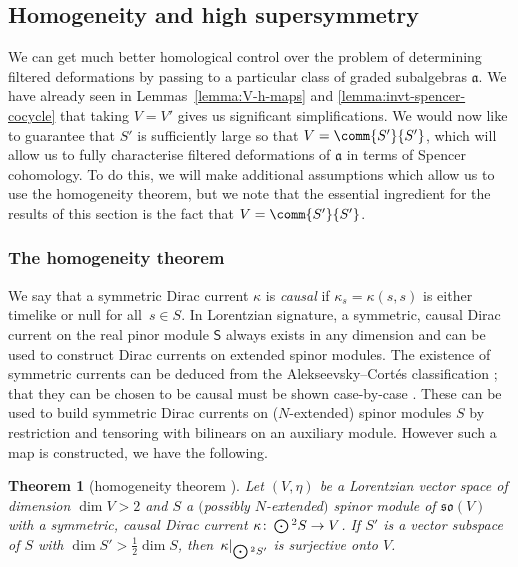 \documentclass[pdftex]{sigma}
\numberwithin{equation}{section}
\newtheorem{Theorem}{Theorem}[section]
\newcommand{\fa}{\mathfrak{a}}
\newcommand{\fso}{\mathfrak{so}}
\newcommand{\ssS}{\mathsf{S}}
\newcommand{\Odot}{\mathchoice{{\textstyle\bigodot}}{\bigodot}{\bigodot}{\bigodot}}
\newcommand{\1}{\mathbbm{1}}
\begin{document}
\subsection{Homogeneity and high supersymmetry}
\label{sec:homogeneity}

We can get much better homological control over the problem of determining filtered deformations by passing to a particular class of graded subalgebras $\fa$. We have already seen in Lemmas~\ref{lemma:V-h-maps} and \ref{lemma:invt-spencer-cocycle} that taking $V=V'$ gives us significant simplifications. We would now like to guarantee that $S'$ is sufficiently large so that $V=\comm{S'}{S'}$, which will allow us to fully characterise filtered deformations of $\fa$ in terms of Spencer cohomology. To do this, we will make additional assumptions which allow us to use the homogeneity theorem, but we note that the essential ingredient for the results of this section is the fact that $V=\comm{S'}{S'}$.

\subsubsection{The homogeneity theorem}

We say that a symmetric Dirac current $\kappa$ is \emph{causal} if $\kappa_s=\kappa(s,s)$ is either timelike or null for all~${s\in S}$. In Lorentzian signature, a symmetric, causal Dirac current on the real pinor module $\ssS$ always exists in any dimension and can be used to construct Dirac currents on extended spinor modules. The existence of symmetric currents can be deduced from the Alekseevsky--Cort\'es classification \cite{Alekseevsky1997}; that they can be chosen to be causal must be shown case-by-case \cite{Hustler2016}. These can be used to build symmetric Dirac currents on ($N$-extended) spinor modules $S$ by restriction and tensoring with bilinears on an auxiliary module. However such a map is constructed, we have the following.

\begin{Theorem}[homogeneity theorem \cite{Figueroa-OFarrill2012,Hustler2016}]\label{thm:homogeneity}
	Let $(V,\eta)$ be a Lorentzian vector space of dimension $\dim V>2$ and $S$ a $($possibly $N$-extended$)$ spinor module of $\fso(V)$ with a symmetric, causal Dirac current $\kappa\colon \Odot^2 S \to V$. If $S'$ is a vector subspace of $S$ with $\dim S'>\frac{1}{2}\dim S$, then~${\kappa|_{\Odot^2S'}}$ is surjective onto $V$.
\end{Theorem}
\end{document}
